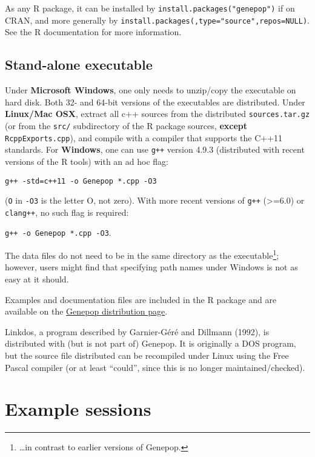 \documentclass[12pt,]{book}
\let\rmarkdownfootnote\footnote%
\def\footnote{\protect\rmarkdownfootnote}
\begin{document}
As any R package, it can be installed by
\texttt{install.packages("genepop")} if on CRAN, and more generally by
\texttt{install.packages(}\texttt{,type="source",repos=NULL)}. See the R
documentation for more information.

\subsection{Stand-alone executable}\label{stand-alone-executable}

Under \textbf{Microsoft
Windows}, one only needs to
unzip/copy the executable on hard disk. Both 32- and 64-bit versions of
the executables are distributed. Under \textbf{Linux/Mac
OSX},  extract all c++ sources
from the distributed \texttt{sources.tar.gz} (or from the \texttt{src/}
subdirectory of the R package sources, \textbf{except}
\texttt{RcppExports.cpp}), and compile with a compiler that supports the
C++11 standards. For \textbf{Windows}, one can use \texttt{g++} version
4.9.3 (distributed with recent versions of the R tools) with an ad hoc
flag:

\texttt{g++\ -std=c++11\ -o\ Genepop\ *.cpp\ -O3}

(\texttt{O} in \texttt{-O3} is the letter O, not zero). With more recent
versions of \texttt{g++} (\textgreater{}=6.0) or \texttt{clang++}, no
such flag is required:

\texttt{g++\ -o\ Genepop\ *.cpp\ -O3}.

The data files do not need to be in the same directory as the
executable\footnote{\ldots{}in contrast to earlier versions of Genepop.};
however, users might find that specifying path names under Windows is
not as easy at it should.

Examples and documentation files are included in the R package and are
available on the
\href{http://kimura.univ-montp2.fr/~rousset/Genepop.htm}{Genepop
distribution page}.

Linkdos, a program described by Garnier-Géré and
Dillmann (1992), is distributed with (but is not part of) Genepop. It is
originally a DOS program, but the source file distributed can be
recompiled under Linux using the Free Pascal compiler (or at least
``could'', since this is no longer maintained/checked).

\section{Example sessions}\label{example-sessions}
\end{document}
